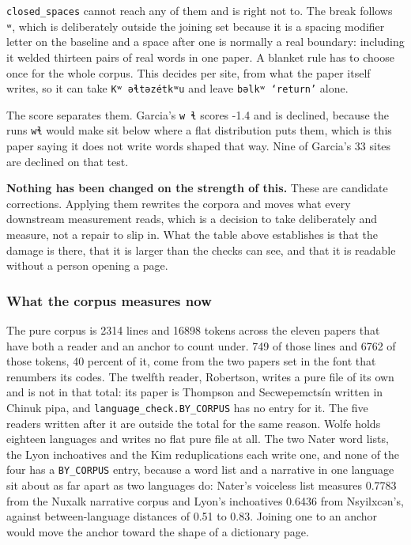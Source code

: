 \texttt{closed\_\allowbreak{}spaces} cannot reach any of them and is right not to. The break follows \texttt{ʷ}, which is deliberately outside the joining set because it is a spacing modifier letter on the baseline and a space after one is normally a real boundary: including it welded thirteen pairs of real words in one paper. A blanket rule has to choose once for the whole corpus. This decides per site, from what the paper itself writes, so it can take \texttt{Kʷ əɬtəzétkʷu} and leave \texttt{bəlkʷ ‘return’} alone.

The score separates them. Garcia's \texttt{w ɬ} scores -1.4 and is declined, because the runs \texttt{wɬ} would make sit below where a flat distribution puts them, which is this paper saying it does not write words shaped that way. Nine of Garcia's 33 sites are declined on that test.

\textbf{Nothing has been changed on the strength of this.} These are candidate corrections. Applying them rewrites the corpora and moves what every downstream measurement reads, which is a decision to take deliberately and measure, not a repair to slip in. What the table above establishes is that the damage is there, that it is larger than the checks can see, and that it is readable without a person opening a page.

\subsubsection{What the corpus measures now}

The pure corpus is 2314 lines and 16898 tokens across the eleven papers that have both a reader and an anchor to count under. 749 of those lines and 6762 of those tokens, 40 percent of it, come from the two papers set in the font that renumbers its codes. The twelfth reader, Robertson, writes a pure file of its own and is not in that total: its paper is Thompson and Secwepemctsín written in Chinuk pipa, and \texttt{language\_\allowbreak{}check.\allowbreak{}BY\_\allowbreak{}CORPUS} has no entry for it. The five readers written after it are outside the total for the same reason. Wolfe holds eighteen languages and writes no flat pure file at all. The two Nater word lists, the Lyon inchoatives and the Kim reduplications each write one, and none of the four has a \texttt{BY\_\allowbreak{}CORPUS} entry, because a word list and a narrative in one language sit about as far apart as two languages do: Nater's voiceless list measures 0.7783 from the Nuxalk narrative corpus and Lyon's inchoatives 0.6436 from Nsyilxcən's, against between-language distances of 0.51 to 0.83. Joining one to an anchor would move the anchor toward the shape of a dictionary page.

